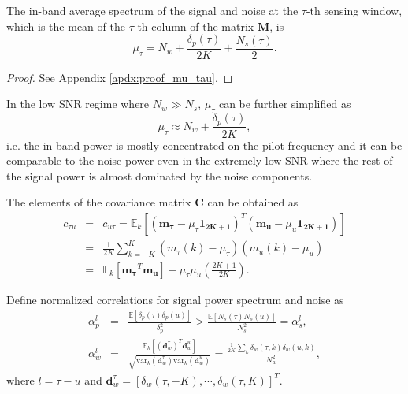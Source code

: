 \documentclass[draftclsnofoot,onecolumn,12pt]{IEEEtran}
\begin{document}
\begin{lemma}\label{lem:mu_tau}
The in-band average spectrum of the signal and noise at the $\tau$-th sensing window, which is the mean of the $\tau$-th column of the matrix $\mathbf{M}$, is
  \begin{equation}
    \mu_\tau  = N_w + \frac{\delta_p(\tau)}{2K} + \frac{N_s(\tau)}{2}.
  \end{equation}
\end{lemma}
\begin{proof}
  See Appendix \ref{apdx:proof_mu_tau}.
\end{proof}

In the low SNR regime where $N_w \gg N_s$, $\mu_\tau$ can be further simplified as
\begin{equation}
    \mu_\tau  \approx  N_w + \frac{\delta_p(\tau)}{2K}, \label{eq:Nw+Ns}
\end{equation}
i.e. the in-band power is mostly concentrated on the pilot frequency and it can be comparable to the noise power even in the extremely low SNR where the rest of the signal power is almost dominated by the noise components.


The elements of the covariance matrix $\mathbf{C}$ can be obtained as
\begin{eqnarray}
  c_{\tau u} &=& c_{u \tau} = \mathbb{E}_k\left[(\mathbf{m_\tau} - \mu_\tau\boldsymbol{1_{2K+1}})^T(\mathbf{m_u} -
  \mu_u\boldsymbol{1_{2K+1}})\right] \\
        &=& \frac{1}{2K} \sum_{k=-K}^K \left(m_\tau\left(k\right) - \mu_\tau\right) \left(m_u\left(k\right) - \mu_u \right) \\
	&=& \mathbb{E}_k[\mathbf{m_\tau}^T \mathbf{m_u}] - \mu_\tau \mu_u \left(\frac{2K+1}{2K}\right). \label{eq:E[c_tau_u]}
\end{eqnarray}

Define normalized correlations for signal power spectrum and noise as
\begin{eqnarray}
  \alpha_p^l &=& \frac{\mathbb{E}[\delta_p(\tau) \delta_p(u)]}{\delta_p^2} > \frac{\mathbb{E}[N_s(\tau) N_s(u)]}{N_s^2} = \alpha_s^l, \\
\alpha_w^l &=& \frac{\mathbb{E}_k[(\mathbf{d}_w^\tau)^T \mathbf{d}_w^u]}{\sqrt{\mathrm{var}_k(\mathbf{d}_w^\tau) \mathrm{var}_k(\mathbf{d}_w^u)}}
  = \frac{\frac{1}{2K} \sum_k \delta_w(\tau, k) \delta_w(u, k)}{N_w^2},
\end{eqnarray}
where $l = \tau - u$ and $\mathbf{d}_w^\tau = [\delta_w(\tau,-K), \cdots, \delta_w(\tau,K)]^T$.
\end{document}
